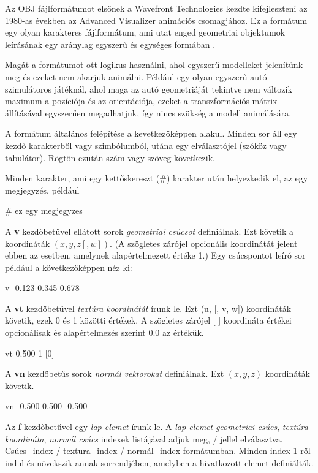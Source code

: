 
Az OBJ fájlformátumot elsőnek a Wavefront Technologies kezdte kifejleszteni az 1980-as években az Advanced Visualizer animációs csomagjához. Ez a formátum egy olyan karakteres fájlformátum, ami utat enged geometriai objektumok leírásának egy aránylag egyszerű és egységes formában \cite{martinreddy}.

Magát a formátumot ott logikus használni, ahol egyszerű modelleket jelenítünk meg és ezeket nem akarjuk animálni. Például egy olyan egyszerű autó szimulátoros játéknál, ahol maga az autó geometriáját tekintve nem változik maximum a pozíciója és az orientációja, ezeket a transzformációs mátrix állításával egyszerűen megadhatjuk, így nincs szükség a modell animálására.


A formátum általános felépítése a kevetkezőképpen alakul.
Minden sor áll egy kezdő karakterből vagy szimbólumból, utána egy elválasztójel (szóköz vagy tabulátor). Rögtön ezután szám vagy szöveg következik.

Minden karakter, ami egy kettőskereszt (\#) karakter után helyezkedik el, az egy megjegyzés, például
\begin{python}
# ez egy megjegyzes
\end{python}
A \textbf{v} kezdőbetűvel ellátott sorok \textsl{geometriai csúcsot} definiálnak. Ezt követik a koordináták $(x, y, z [, w])$. (A szögletes zárójel opcionális koordinátát jelent ebben az esetben, amelynek alapértelmezett értéke 1.) Egy csúcspontot leíró sor például a következőképpen néz ki:
\begin{python}
v -0.123 0.345 0.678
\end{python}
A \textbf{vt} kezdőbetűvel \textsl{textúra koordinátát} írunk le. Ezt (u, [, v, w]) koordináták követik, ezek 0 és 1 közötti értékek. A szögletes zárójel [ ] koordináta értékei opcionálisak és alapértelmezés szerint 0.0 az értékük.
\begin{python}
vt 0.500 1 [0]
\end{python}
\bigskip
A \textbf{vn} kezdőbetűs sorok \textsl{normál vektorokat} definiálnak. Ezt $(x, y, z)$ koordináták követik.
\begin{python}
vn -0.500 0.500 -0.500
\end{python}
\bigskip
Az \textbf{f} kezdőbetűvel egy \textsl{lap elemet} írunk le. A \textsl{lap elemet} \textsl{geometriai csúcs}, \textsl{textúra koordináta}, \textsl{normál csúcs} indexek listájával adjuk meg, {/} jellel elválasztva. Csúcs{\_}index {/} textura{\_}index {/}  normál{\_}index formátumban. Minden index 1-ről indul és növekszik annak sorrendjében, amelyben a hivatkozott elemet definiálták.\\

